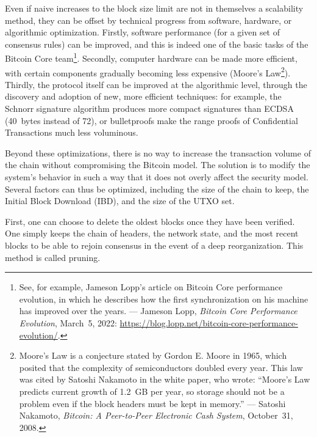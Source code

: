 \documentclass[
  a5paper,
  smalldemyvopaper,10pt,twoside,onecolumn,openright,extrafontsizes,hidelinks]{memoir}
\begin{document}
Even if naive increases to the block size limit are not in themselves a
scalability method, they can be offset by technical progress from
software, hardware, or algorithmic optimization. Firstly, software
performance (for a given set of consensus rules) can be improved, and
this is indeed one of the basic tasks of the Bitcoin Core
team\footnote{See, for example, Jameson Lopp's article on Bitcoin Core
  performance evolution, in which he describes how the first
  synchronization on his machine has improved over the years. ---
  Jameson Lopp, \emph{Bitcoin Core Performance Evolution}, March~5,
  2022: \url{https://blog.lopp.net/bitcoin-core-performance-evolution/}.}.
Secondly, computer hardware can be made more efficient, with certain
components gradually becoming less expensive (Moore's Law\footnote{Moore's
  Law is a conjecture stated by Gordon E. Moore in 1965, which posited
  that the complexity of semiconductors doubled every year. This law was
  cited by Satoshi Nakamoto in the white paper, who wrote: ``Moore's Law
  predicts current growth of 1.2~GB per year, so storage should not be a
  problem even if the block headers must be kept in memory.'' ---
  Satoshi Nakamoto, \emph{Bitcoin: A Peer-to-Peer Electronic Cash
  System}, October~31, 2008.}). Thirdly, the protocol itself can be
improved at the algorithmic level, through the discovery and adoption of
new, more efficient techniques: for example, the Schnorr signature
algorithm produces more compact signatures than ECDSA (40~bytes instead
of 72), or bulletproofs make the range proofs of Confidential
Transactions much less voluminous.

Beyond these optimizations, there is no way to increase the transaction
volume of the chain without compromising the Bitcoin model. The solution
is to modify the system's behavior in such a way that it does not overly
affect the security model. Several factors can thus be optimized,
including the size of the chain to keep, the Initial Block Download
(IBD), and the size of the UTXO set.

First, one can choose to delete the oldest blocks once they have been
verified. One simply keeps the chain of headers, the network state, and
the most recent blocks to be able to rejoin consensus in the event of a
deep reorganization. This method is called pruning.
\end{document}
